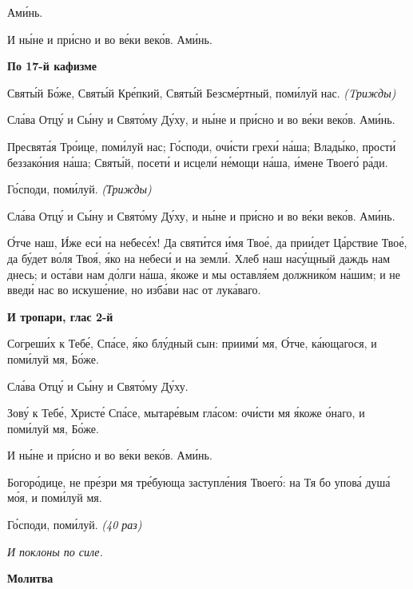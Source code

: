 Ами́нь.


   И ны́не и при́сно и во ве́ки веко́в. Ами́нь.
   


 

\bfseries По 17-й кафизме\normalfont{}


   Святы́й Бо́же, Святы́й Кре́пкий, Святы́й Безсме́ртный, поми́луй нас.
\itshape (Tрижды)\normalfont{}


   Сла́ва Отцу́ и Сы́ну и Свято́му Ду́ху, и ны́не и при́сно и во ве́ки веко́в.
Ами́нь.


   Пресвята́я Тро́ице, поми́луй нас; Го́споди, очи́сти грехи́ на́ша; Влады́ко,
прости́ беззако́ния на́ша; Святы́й, посети́ и исцели́ не́мощи на́ша, и́мене
Твоего́ ра́ди.


   Го́споди, поми́луй. \itshape (Трижды)\normalfont{}


   Сла́ва Отцу́ и Сы́ну и Свято́му Ду́ху, и ны́не и при́сно и во ве́ки веко́в.
Ами́нь.


   О́тче наш, И́же еси́ на небесе́х! Да святи́тся и́мя Твое́, да прии́дет
Ца́рствие Твое́, да бу́дет во́ля Твоя́, я́ко на небеси́ и на земли́. Хлеб наш
насу́щный даждь нам днесь; и оста́ви нам до́лги на́ша, я́коже и мы оставля́ем
должнико́м на́шим; и не введи́ нас во искуше́ние, но изба́ви нас от
лука́ваго.



 

\bfseries И тропари, глас 2-й\normalfont{}


   Согреши́х к Тебе́, Спа́се, я́ко блу́дный сын: приими́ мя, О́тче, ка́ющагося,
и поми́луй мя, Бо́же.


   Сла́ва Отцу́ и Сы́ну и Свято́му Ду́ху.


   Зову́ к Тебе́, Христе́ Спа́се, мытаре́вым гла́сом: очи́сти мя я́коже о́наго, и
поми́луй мя, Бо́же.


   И ны́не и при́сно и во ве́ки веко́в. Ами́нь.


   Богоро́дице, не пре́зри мя тре́бующа заступле́ния Твоего́: на Тя бо упова́
душа́ мо́я, и поми́луй мя.


   Го́споди, поми́луй. \itshape (40 раз)\normalfont{}


 \itshape И поклоны по силе.\normalfont{}



 

\bfseries Молитва\normalfont{}


